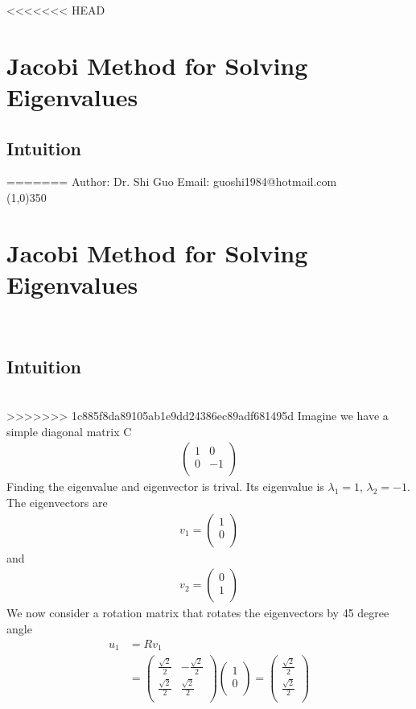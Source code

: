 \documentclass[a4paper]{article}
\begin{document}
<<<<<<< HEAD
\section{Jacobi Method for Solving Eigenvalues}
\subsection{Intuition}
=======
Author: Dr. Shi Guo  \hspace{30mm} Email: guoshi1984@hotmail.com\\
\line(1,0){350}
\section{Jacobi Method for Solving Eigenvalues}\\
\subsection{Intuition}\\
>>>>>>> 1c885f8da89105ab1e9dd24386ec89adf681495d
Imagine we have a simple diagonal matrix C\\
\begin{align*}
\left( \begin{array}{cc}
1 & 0\\
0 & -1\\
\end{array} \right)
\end{align*}
Finding the eigenvalue and eigenvector is trival. Its eigenvalue is $\lambda_1 = 1$, $\lambda_2 = -1$. The eigenvectors are
\begin{align*}
	v_1 = 
	\left(  \begin{array} {c}
		1 \\
		0 \\
	\end{array} \right) 
\end{align*}
and
\begin{align*}
	v_2 = 
	\left( \begin{array} {c}
		0 \\
		1 \\
	\end{array} \right) 
\end{align*}
We now consider a rotation matrix that rotates the eigenvectors by 45 degree angle
\begin{align*}
	u_1 & = R v_1 \\
	& =\left(  \begin{array} {cc}
		\frac{\sqrt{2}}{2}& -\frac{\sqrt{2}}{2}\\
		\frac{\sqrt{2}}{2}& \frac{\sqrt{2}}{2}\\
	\end{array} \right) 
	\left(  \begin{array} {c}
		1 \\
		0 \\
	\end{array} \right) 
	=
	\left(  \begin{array} {c}
		\frac{\sqrt{2}}{2} \\
		\frac{\sqrt{2}}{2} \\
	\end{array} \right) 
\end{align*}
\end{document}
